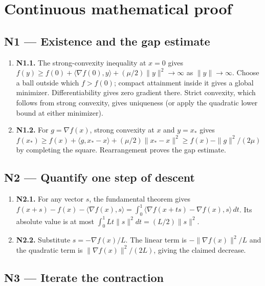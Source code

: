 \documentclass[preprint,12pt,aps,pra,showkeys,amsmath,amssymb,superscriptaddress,floatfix]{revtex4-2}
\theoremstyle{definition}
\theoremstyle{remark}
\begin{document}
\endgroup\clearpage\section{Continuous mathematical proof}\label{sec:proof}

\subsection{N1 --- Existence and the gap
estimate}\label{n1-existence-and-the-gap-estimate}

\begin{enumerate}
\def\labelenumi{\arabic{enumi}.}
\item
  \textbf{N1.1.} The strong-convexity inequality at \(x=0\) gives
  \(f(y)\ge f(0)+\langle\nabla f(0),y\rangle+(\mu/2)\|y\|^2\to\infty\)
  as \(\|y\|\to\infty\). Choose a ball outside which \(f>f(0)\); compact
  attainment inside it gives a global minimizer. Differentiability gives
  zero gradient there. Strict convexity, which follows from strong
  convexity, gives uniqueness (or apply the quadratic lower bound at
  either minimizer).
\item
  \textbf{N1.2.} For \(g=\nabla f(x)\), strong convexity at \(x\) and
  \(y=x_*\) gives
  \(f(x_*)\ge f(x)+\langle g,x_*-x\rangle+(\mu/2)\|x_*-x\|^2\ge f(x)-\|g\|^2/(2\mu)\)
  by completing the square. Rearrangement proves the gap estimate.
\end{enumerate}

\subsection{N2 --- Quantify one step of
descent}\label{n2-quantify-one-step-of-descent}

\begin{enumerate}
\def\labelenumi{\arabic{enumi}.}
\item
  \textbf{N2.1.} For any vector \(s\), the fundamental theorem gives
  \(f(x+s)-f(x)-\langle\nabla f(x),s\rangle=\int_0^1\langle\nabla f(x+ts)-\nabla f(x),s\rangle\,dt\).
  Its absolute value is at most \(\int_0^1 Lt\|s\|^2dt=(L/2)\|s\|^2\).
\item
  \textbf{N2.2.} Substitute \(s=-\nabla f(x)/L\). The linear term is
  \(-\|\nabla f(x)\|^2/L\) and the quadratic term is
  \(\|\nabla f(x)\|^2/(2L)\), giving the claimed decrease.
\end{enumerate}

\subsection{N3 --- Iterate the
contraction}\label{n3-iterate-the-contraction}
\end{document}
